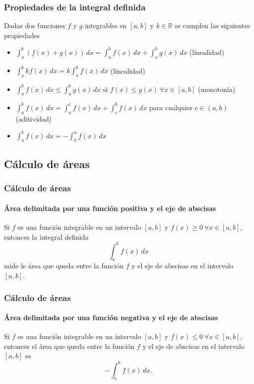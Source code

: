 \begin{frame}
\frametitle{Propiedades de la integral definida}
Dadas dos funciones $f$ y $g$ integrables en $[a,b]$ y $k \in \mathbb{R}$ se cumplen las siguientes propiedades
\begin{itemize}
\item $\int_{a}^{b}(f(x)+g(x))\,dx=\int_{a}^{b}f(x)\,dx+\int_{a}^{b}g(x)\,dx$ (linealidad)
\item $\int_{a}^{b}{kf(x)}\,dx=k\int_{a}^{b}{f(x)}\,dx$ (linealidad)
\item $\int_{a}^{b}{f(x)\,dx} \leq \int_{a}^{b}{g(x)\,dx}$ si $f(x)\leq g(x)\ \forall x \in [a,b]$ (monotonía)
\item $\int_{a}^{b}{f(x)\,dx} = \int_{a}^{c}{f(x)\,dx}+\int_{c}^{b}{f(x)\,dx}$ para cualquier $c\in(a,b)$ (aditividad)
\item $\int_a^b f(x)\,dx = -\int_b^a f(x)\,dx$
\end{itemize}
\end{frame}



\subsection{Cálculo de áreas}
\begin{frame}
\frametitle{Cálculo de áreas}
\framesubtitle{Área delimitada por una función positiva y el eje de abscisas}
Si $f$ es una función integrable en un intervalo $[a,b]$ y $f(x)\geq 0\ \forall x\in[a,b]$, entonces la integral definida
\[\int_a^b f(x)\,dx\]
mide le área que queda entre la función $f$ y el eje de abscisas en el intervalo $[a,b]$.
\begin{center}
\scalebox{1}{}
\end{center}
\end{frame}


\begin{frame}
\frametitle{Cálculo de áreas}
\framesubtitle{Área delimitada por una función negativa y el eje de abscisas}
Si $f$ es una función integrable en un intervalo $[a,b]$ y $f(x)\leq 0\ \forall x\in[a,b]$, entonces el área que queda entre la función $f$ y el eje de abscisas en el intervalo $[a,b]$ es
\[
-\int_a^b f(x)\,dx.
\]
\begin{center}
\scalebox{1}{}
\end{center}
\end{frame}


